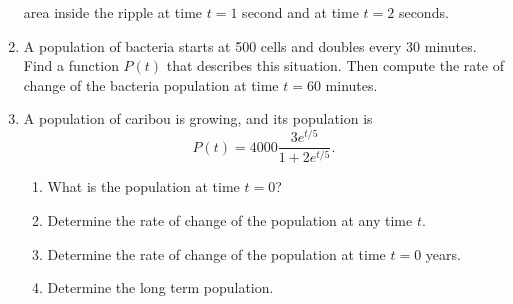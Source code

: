 \documentclass[11pt,fleqn]{article}
\begin{document}
\begin{enumerate}
area inside the ripple at time $t=1$ second and at time $t=2$ seconds.
\vfill
\item A population of bacteria starts at 500 cells and doubles every
30 minutes.  Find a function $P(t)$ that describes this situation.
Then compute the rate of change of the bacteria population at time $t=60$ minutes.
\vfill
\newpage
\item A population of caribou is growing, and its population is
\[
P(t) = 4000\frac{3e^{t/5}}{1+2e^{t/5}}.
\]
\begin{enumerate}
\item What is the population at time $t=0$?
\vfill
\item Determine the rate of change of the population at any time $t$.
\vfill
\item Determine the rate of change of the population at time $t=0$ years.
\vfill
\item Determine the long term population.
\vfill
\end{enumerate}

\end{enumerate}
\end{document}
